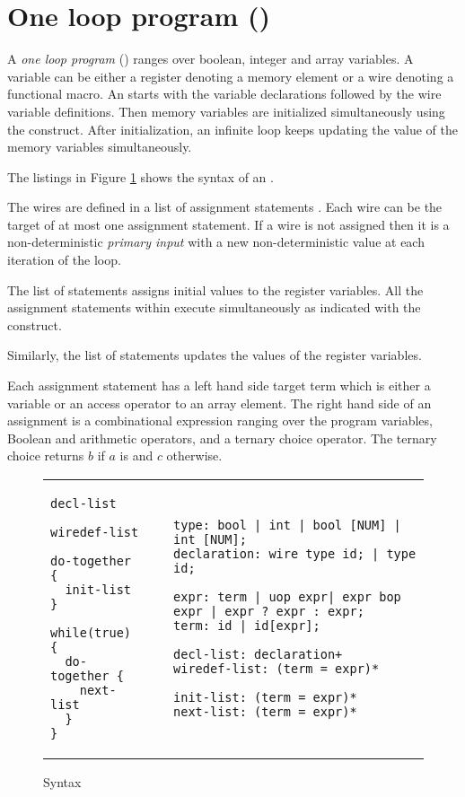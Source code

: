 \section{One loop program (\caig) }
\label{s:this}
A {\em one loop program} (\caig) ranges over boolean, 
integer and array variables. 
A variable can be either a register denoting a memory element or a wire denoting a functional macro.
An \caig starts with the variable declarations followed by the wire variable definitions. 
Then memory variables are initialized simultaneously using the  construct. 
After initialization, an infinite loop keeps updating the value of the memory variables simultaneously. 

The listings in Figure \ref{fig:gr} shows the syntax of an \caig. 

The wires are defined in a list of assignment statements . 
Each wire can be the target of at most one assignment statement. 
If a wire is not assigned then it is a non-deterministic {\em primary input}
with a new non-deterministic value at each iteration of the loop. 

The list of statements  assigns initial values to 
the register variables. All the assignment statements within  execute
simultaneously as indicated with the  construct.

Similarly, the  list of statements updates the values 
of the register variables. 

Each assignment statement has a left hand side target term 
which is either a variable or an access operator to an 
array element. 
The right hand side of an assignment is a combinational expression ranging over the program variables,  Boolean and arithmetic operators, and a ternary choice 
operator. The ternary choice  returns $b$ if $a$ 
is \true and $c$ otherwise. 

\begin{figure}
\begin{tabular}{p{3cm}p{0.5cm}p{12cm}}
\begin{lstlisting}
decl-list

wiredef-list

do-together {
  init-list 
}

while(true) {
  do-together {
    next-list
  } 
}
\end{lstlisting}
&
&
\begin{lstlisting}
type: bool | int | bool [NUM] | int [NUM]; 
declaration: wire type id; | type id;

expr: term | uop expr| expr bop expr | expr ? expr : expr;
term: id | id[expr]; 

decl-list: declaration+
wiredef-list: (term = expr)*

init-list: (term = expr)* 
next-list: (term = expr)* 
\end{lstlisting}
\end{tabular}
\caption{\caig Syntax}
\label{fig:gr}
\end{figure}
